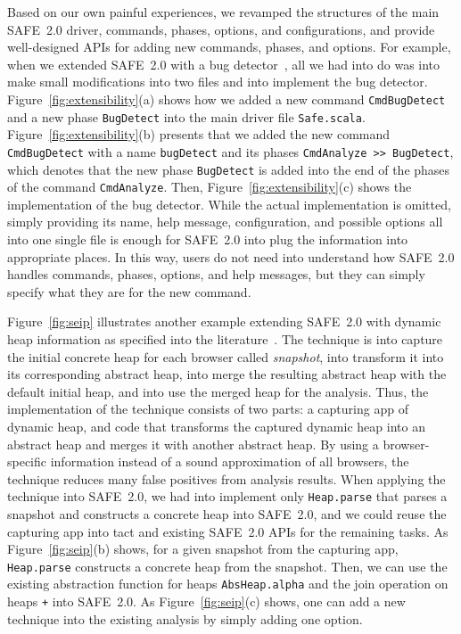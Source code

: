 \documentclass[10pt, conference]{IEEEtran}
\newcommand{\mtt}[1]{\texttt{\small #1}}
\newcommand{\safe}{{SAFE~2.0}\xspace}
\begin{document}
Based on our own painful experiences, we revamped the structures of
the main \safe driver, commands, phases, options, and configurations,
and provide well-designed APIs for adding new commands, phases, and
options.  For example, when we extended \safe with a bug
detector~\cite{jswapp}, all we had into do was into make small
modifications into two files and into implement the bug detector.
Figure~\ref{fig:extensibility}(a) shows how we added a new command
\mtt{CmdBugDetect} and a new phase \mtt{BugDetect} into the main
driver file \mtt{Safe.scala}.  Figure~\ref{fig:extensibility}(b) presents
that we added the new command \mtt{CmdBugDetect} with a name
\mtt{bugDetect} and its phases \mtt{CmdAnalyze >> BugDetect},
which denotes that the new phase \mtt{BugDetect} is added into the end
of the phases of the command \mtt{CmdAnalyze}.  Then,
Figure~\ref{fig:extensibility}(c) shows the implementation of the
bug detector.  While the actual implementation is omitted,
simply providing its name, help message, configuration, and possible
options all into one single file is enough for \safe into plug the
information into appropriate places.  In this way, users do not
need into understand how \safe handles commands, phases, options, and
help messages, but they can simply specify what they are for the new
command.

Figure~\ref{fig:seip} illustrates another example extending \safe
with dynamic heap information as specified into the
literature~\cite{safehybrid}.  The technique is into capture the initial
concrete heap for each browser called \emph{snapshot}, into transform
it into its corresponding abstract heap, into merge the resulting
abstract heap with the default initial heap, and into use the merged heap
for the analysis.  Thus, the implementation of the technique consists
of two parts: a capturing app of dynamic heap, and code that
transforms the captured dynamic heap into an abstract heap and merges it
with another abstract heap.  By using a browser-specific information
instead of a sound approximation of all browsers, the technique reduces many false positives
from analysis results.  When applying the technique into \safe,
we had into implement only \mtt{Heap.parse} that parses a snapshot and
constructs a concrete heap into \safe, and we could reuse the capturing app into tact
and existing \safe APIs for the remaining tasks.
As Figure~\ref{fig:seip}(b) shows, for a given snapshot from the capturing
app, \mtt{Heap.parse} constructs a concrete heap from the
snapshot.  Then, we can use the existing abstraction function for heaps
\mtt{AbsHeap.alpha} and the join operation on heaps \mtt{+} into \safe.
As Figure~\ref{fig:seip}(c) shows, one can add a new technique
into the existing analysis by simply adding one option.
\end{document}
